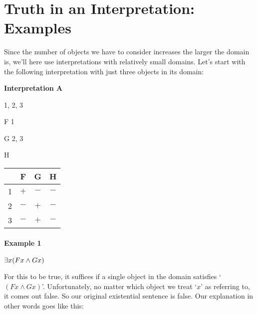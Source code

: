 \section{Truth in an Interpretation: Examples}

 Since the number of objects we have to consider increases the larger the domain is, we'll here use interpretations with relatively small domains.  Let's start with the following interpretation with just three objects in its domain:\\

\begin{minipage}{\textwidth}
\begin{center}
\textbf{Interpretation A}
\begin{multicols}{2}
	\begin{ekey}
		\item[\text{Domain}] 1, 2, 3
		\item[F] 1
		\item[G] 2, 3
		\item[H]
	\end{ekey}
\columnbreak

\begin{center}\begin{tabular}{|c|c|c|c|}
\hline
    &   F   &   G  & H  \\ \hline
1   &   $+$   &   $-$  & $-$  \\ \hline
2   &   $-$   &   $+$ & $-$ \\ \hline
3   &   $-$   &   $+$ & $-$ \\ \hline
\end{tabular}\end{center}
\end{multicols}
\end{center}
\end{minipage}


\paragraph{Example 1} $\exists x(Fx \wedge Gx)$

\noindent For this to be true, it suffices if a single object in the domain satisfies `$(Fx \land Gx)$'.  Unfortunately, no matter which object we treat `$x$' as referring to, it comes out false.  So our original existential sentence is false.  Our explanation in other words goes like this:

